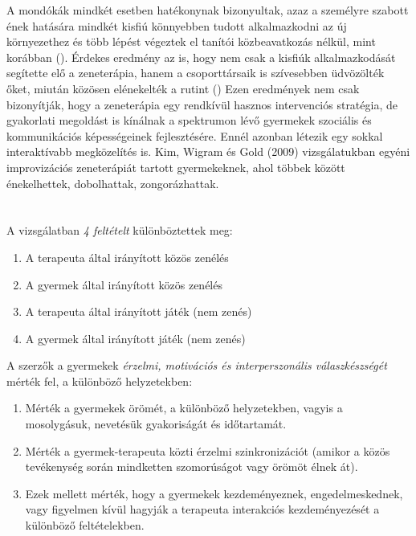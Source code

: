 A mondókák mindkét esetben hatékonynak bizonyultak, azaz a személyre szabott ének hatására mindkét kisfiú könnyebben tudott alkalmazkodni az új környezethez és több lépést végeztek el tanítói közbeavatkozás nélkül, mint korábban (\cite{kern_wolery_aldridge_2006}). Érdekes eredmény az is, hogy nem csak a kisfiúk alkalmazkodását segítette elő a zeneterápia, hanem a csoporttársaik is szívesebben üdvözölték őket, miután közösen elénekelték a rutint (\cite{kern_wolery_aldridge_2006}) Ezen eredmények nem csak bizonyítják, hogy a zeneterápia egy rendkívül hasznos intervenciós stratégia, de gyakorlati megoldást is kínálnak a spektrumon lévő gyermekek szociális és kommunikációs képességeinek fejlesztésére. Ennél azonban létezik egy sokkal interaktívabb megközelítés is. Kim, Wigram és Gold (2009) vizsgálatukban egyéni improvizációs zeneterápiát tartott gyermekeknek, ahol többek között énekelhettek, dobolhattak, zongorázhattak. 
\\ \\ \\ 
A vizsgálatban \textit{4 feltételt} különböztettek meg:
\begin{enumerate}
	\item A terapeuta által irányított közös zenélés
	\item A gyermek által irányított közös zenélés
	\item A terapeuta által irányított játék (nem zenés)
	\item A gyermek által irányított játék (nem zenés)
\end{enumerate}    
A szerzők a gyermekek \textit{érzelmi, motivációs és interperszonális válaszkészségét } mérték fel, a különböző helyzetekben:

\begin{enumerate}
	\item Mérték a gyermekek örömét, a különböző helyzetekben, vagyis a mosolygásuk, nevetésük gyakoriságát és időtartamát.
	\item Mérték a gyermek-terapeuta közti érzelmi szinkronizációt (amikor a közös tevékeny\-ség során mindketten szomorúságot vagy örömöt élnek át).
	\item Ezek mellett mérték, hogy a gyermekek kezdeményeznek, engedelmeskednek, vagy figyelmen kívül hagyják a terapeuta interakciós kezdeményezését a különböző felté\-telekben.
\end{enumerate} 

